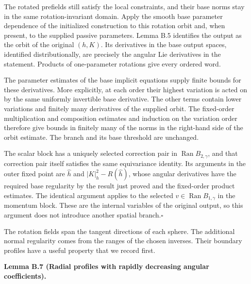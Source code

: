 \documentclass[
  english,
  11pt,
  reqno]{amsart}
\makeatletter
\newcommand{\pandocstatementheading}[1]{%
  \par\if@nobreak\else
    \addpenalty{\@beginparpenalty}%
    \addvspace{.5\baselineskip plus .2\baselineskip minus .2\baselineskip}%
  \fi
  {\normalfont\bfseries #1\par}%
  \nobreak\@afterindenttrue\@afterheading
}
\makeatother
\begin{document}
The rotated prefields still satisfy the local constraints, and their
base norms stay in the same rotation-invariant domain. Apply the smooth
base parameter dependence of the initialized construction to this
rotation orbit and, when present, to the supplied passive parameters.
Lemma B.5 identifies the output as the orbit of the original \((h,K)\).
Its derivatives in the base output spaces, identified distributionally,
are precisely the angular Lie derivatives in the statement. Products of
one-parameter rotations give every ordered word.

The parameter estimates of the base implicit equations supply finite
bounds for these derivatives. More explicitly, at each order their
highest variation is acted on by the same uniformly invertible base
derivative. The other terms contain lower variations and finitely many
derivatives of the supplied orbit. The fixed-order multiplication and
composition estimates and induction on the variation order therefore
give bounds in finitely many of the norms in the right-hand side of the
orbit estimate. The branch and its base threshold are unchanged.

The scalar block has a uniquely selected correction pair in
\(\operatorname{Ran}B_{2,\gamma}\), and that correction pair itself
satisfies the same equivariance identity. Its arguments in the outer
fixed point are \(\widehat h\) and \(|K|_h^2-R(\widehat h)\), whose
angular derivatives have the required base regularity by the result just
proved and the fixed-order product estimates. The identical argument
applies to the selected \(v\in\operatorname{Ran}B_{1,\gamma}\) in the
momentum block. These are the internal variables of the original output,
so this argument does not introduce another spatial branch.\nobreak\hfill\quad\(\square\)

The rotation fields span the tangent directions of each sphere. The
additional normal regularity comes from the ranges of the chosen
inverses. Their boundary profiles have a useful property that we record
first.

\pandocstatementheading{\leavevmode{}\label{lem:online-extension-radial-profile-regularity}Lemma B.7 (Radial profiles with rapidly decreasing angular
coefficients).}
\end{document}
